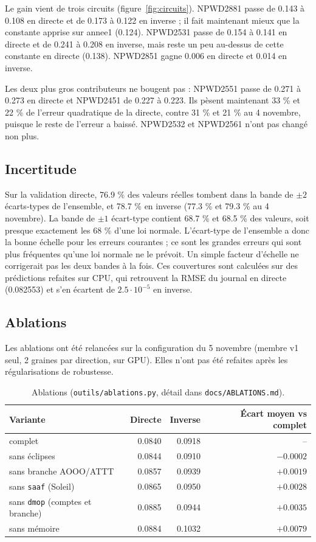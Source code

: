 \documentclass[11pt,a4paper]{article}
\newcommand{\code}[1]{\texttt{#1}}
\begin{document}
Le gain vient de trois circuits (figure~\ref{fig:circuits}). NPWD2881 passe de 0.143 à 0.108 en directe et de 0.173 à 0.122 en inverse ; il fait maintenant mieux que la constante apprise sur annee1 (0.124). NPWD2531 passe de 0.154 à 0.141 en directe et de 0.241 à 0.208 en inverse, mais reste un peu au-dessus de cette constante en directe (0.138). NPWD2851 gagne 0.006 en directe et 0.014 en inverse.

Les deux plus gros contributeurs ne bougent pas : NPWD2551 passe de 0.271 à 0.273 en directe et NPWD2451 de 0.227 à 0.223. Ils pèsent maintenant 33 \% et 22 \% de l'erreur quadratique de la directe, contre 31 \% et 21 \% au 4 novembre, puisque le reste de l'erreur a baissé. NPWD2532 et NPWD2561 n'ont pas changé non plus.

\subsection{Incertitude}

Sur la validation directe, 76.9 \% des valeurs réelles tombent dans la bande de $\pm 2$ écarts-types de l'ensemble, et 78.7 \% en inverse (77.3 \% et 79.3 \% au 4 novembre). La bande de $\pm 1$ écart-type contient 68.7 \% et 68.5 \% des valeurs, soit presque exactement les 68 \% d'une loi normale. L'écart-type de l'ensemble a donc la bonne échelle pour les erreurs courantes ; ce sont les grandes erreurs qui sont plus fréquentes qu'une loi normale ne le prévoit. Un simple facteur d'échelle ne corrigerait pas les deux bandes à la fois. Ces couvertures sont calculées sur des prédictions refaites sur CPU, qui retrouvent la RMSE du journal en directe (0.082553) et s'en écartent de $2.5\cdot10^{-5}$ en inverse.

\subsection{Ablations}

Les ablations ont été relancées sur la configuration du 5 novembre (membre v1 seul, 2 graines par direction, sur GPU). Elles n'ont pas été refaites après les régularisations de robustesse.

\begin{table}[!htb]
\centering\small
\caption{Ablations (\code{outils/ablations.py}, détail dans \code{docs/ABLATIONS.md}).}
\label{tab:ablations}
\begin{tabular}{l r r r}
\toprule
Variante & Directe & Inverse & Écart moyen vs complet \\
\midrule
complet & 0.0840 & 0.0918 & -- \\
sans éclipses & 0.0844 & 0.0910 & $-0.0002$ \\
sans branche AOOO/ATTT & 0.0857 & 0.0939 & $+0.0019$ \\
sans \code{saaf} (Soleil) & 0.0865 & 0.0950 & $+0.0028$ \\
sans \code{dmop} (comptes et branche) & 0.0885 & 0.0944 & $+0.0035$ \\
sans mémoire & 0.0884 & 0.1032 & $+0.0079$ \\
\bottomrule
\end{tabular}
\end{table}
\end{document}
